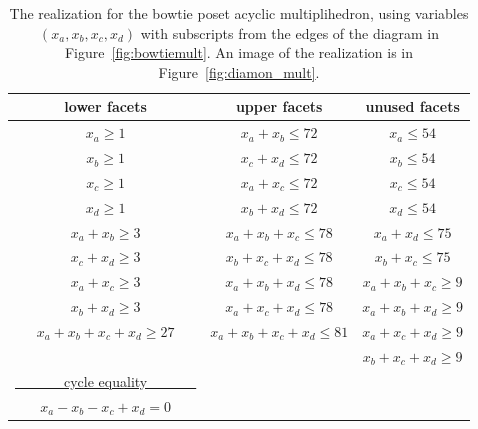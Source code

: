 \documentclass{article}
\begin{document}
\begin{table}[h!]
    \centering
    \begin{tabular}{| c | c | c |}
\hline
 lower facets & upper facets & unused facets \\ \hline
    $x_a \ge 1$  &  $x_a+x_b \le 72$  &  $x_a\le 54$ \\
 $x_b \ge 1$   &  $x_c+x_d \le 72$  &  $x_b\le 54$ \\
  $x_c \ge 1$ &  $x_a +x_c\le 72$   &  $x_c\le 54$ \\
   $x_d \ge 1$    &   $x_b +x_d\le 72$   &  $x_d\le 54$ \\
   $x_a+x_b \ge 3$    &  $x_a+x_b+x_c \le 78$ & $x_a+x_d \le 75$  \\
   $x_c+x_d \ge 3$  &   $x_b+x_c+x_d \le 78$  &  $x_b+x_c \le 75$ \\
$x_a+x_c \ge 3$  & $x_a+x_b+x_d \le 78$ & $x_a+x_b+x_c \ge 9$ \\ 
   $x_b+x_d \ge 3$ & $x_a+x_c+x_d \le 78$ & $x_a+x_b+x_d \ge 9$ \\
 $x_a+x_b+x_c+x_d \ge 27$ &  $x_a+x_b+x_c+x_d \le 81$ & $x_a+x_c+x_d \ge 9$ \\
 & &  $x_b+x_c+x_d \ge 9$\\
\underline{~~~~~~~cycle equality~~~~~~~} && \\
$x_a-x_b-x_c+x_d = 0$&& \\
\hline
\end{tabular}
    \caption{The realization for the bowtie poset acyclic multiplihedron, using variables $(x_a,x_b,x_c,x_d)$ with subscripts from the edges of the diagram in Figure~\ref{fig:bowtiemult}. An image of the realization is in Figure~\ref{fig:diamon_mult}.}
    \label{tab:bow}
\end{table}






\end{document}
